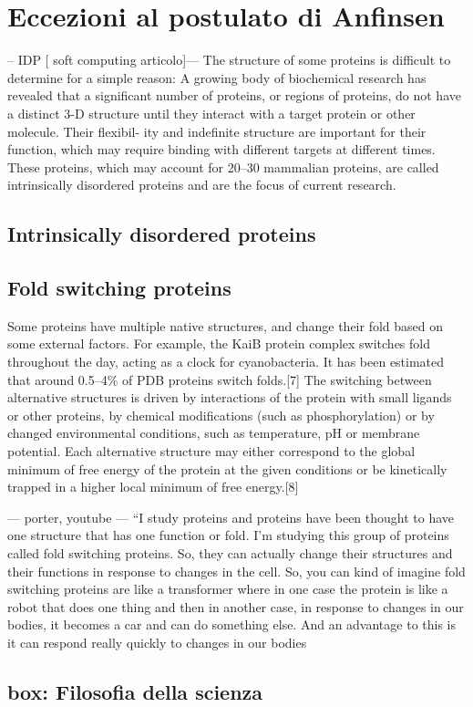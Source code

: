 \section{Eccezioni al postulato di Anfinsen}
{
{
-- IDP [ soft computing articolo]---
The structure of some proteins is difficult to determine
for a simple reason: A growing body of biochemical research
has revealed that a significant number of proteins, or regions
of proteins, do not have a distinct 3-D structure until they
interact with a target protein or other molecule. Their flexibil-
ity and indefinite structure are important for their function,
which may require binding with different targets at different
times. These proteins, which may account for 20–30%
mammalian proteins, are called intrinsically disordered proteins
and are the focus of current research.

}
\subsection{Intrinsically disordered proteins}

\subsection{Fold switching proteins} \label{sec:fold-switching-proteins}
Some proteins have multiple native structures, and change their fold based on some external factors. For example, the KaiB protein complex switches fold throughout the day, acting as a clock for cyanobacteria. It has been estimated that around 0.5–4\% of PDB proteins switch folds.[7] The switching between alternative structures is driven by interactions of the protein with small ligands or other proteins, by chemical modifications (such as phosphorylation) or by changed environmental conditions, such as temperature, pH or membrane potential. Each alternative structure may either correspond to the global minimum of free energy of the protein at the given conditions or be kinetically trapped in a higher local minimum of free energy.[8]


--- porter, youtube ---
“I study proteins and proteins have been thought to have one structure that has one function or fold. I'm studying this group of proteins called fold switching proteins. So, they can actually change their structures and their functions in response to changes in the cell. So, you can kind of imagine fold switching proteins are like a transformer where in one case the protein is like a robot that does one thing and then in another case, in response to changes in our bodies, it becomes a car and can do something else. And an advantage to this is it can respond really quickly to changes in our bodies

\subsection{box: Filosofia della scienza}
}

